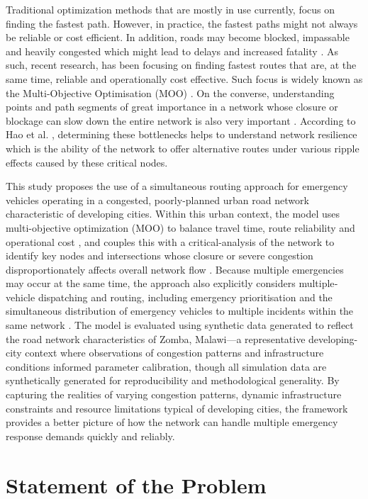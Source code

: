 \documentclass[paper=A4, 12pt, mathscr]{report}
\begin{document}
	Traditional optimization methods that are mostly in use currently, focus on finding the fastest path. However, in practice, the fastest paths might not always be reliable or cost efficient. In addition, roads may become blocked, impassable and heavily congested which might lead to delays and increased fatality \cite{yan2021}. As such, recent research, has been focusing on finding fastest routes that are, at the same time, reliable and operationally cost effective. Such focus is widely known as the Multi-Objective Optimisation (MOO) \cite{tirkolaee2020}. On the converse, understanding points and path segments of great importance in a network whose closure or blockage can slow down the entire network is also very important \cite{luan2024}. According to Hao et al. \cite{hao2024}, determining these bottlenecks helps to understand network resilience which is the ability of the network to offer alternative routes under various ripple effects caused by these critical nodes.
	
	This study proposes the use of a simultaneous routing approach for emergency vehicles operating in a congested, poorly-planned urban road network characteristic of developing cities. Within this urban context, the model uses multi-objective optimization (MOO) to balance travel time, route reliability and operational cost \cite{tirkolaee2020,ding2021}, and couples this with a critical-analysis of the network to identify key nodes and intersections whose closure or severe congestion disproportionately affects overall network flow \cite{luan2024, hao2024, 6}. Because multiple emergencies may occur at the same time, the approach also explicitly considers multiple‐vehicle dispatching and routing, including emergency prioritisation \cite{7} and the simultaneous distribution of emergency vehicles to multiple incidents within the same network \cite{8}. The model is evaluated using synthetic data generated to reflect the road network characteristics of Zomba, Malawi---a representative developing-city context where observations of congestion patterns and infrastructure conditions informed parameter calibration, though all simulation data are synthetically generated for reproducibility and methodological generality. By capturing the realities of varying congestion patterns, dynamic infrastructure constraints and resource limitations typical of developing cities, the framework provides a better picture of how the network can handle multiple emergency response demands quickly and reliably.
	
	\section{Statement of the Problem}
	
\end{document}
